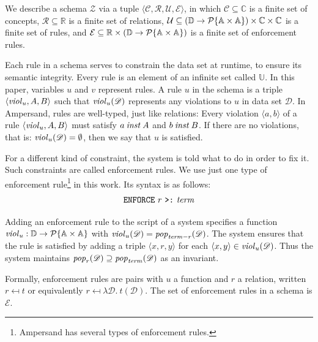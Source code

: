 \documentclass[runningheads]{llncs}
\newcommand{\id}[1]{\text{\it #1\/}}
\newcommand{\popF}[1]{\id{pop}_{#1}}
\newcommand{\pop}[2]{\popF{#1}(#2)}
\newcommand{\instance}{\mathbin{\id{inst}}}
\newcommand{\viol}[2]{\violC{#1}(#2)}
\newcommand{\violC}[1]{\id{viol}_{#1}}
\newcommand{\powerset}[1]{\cal{P}\{#1\}}
\newcommand{\pair}[2]{\langle{#1},{#2}\rangle}
\newcommand{\Pair}[2]{#1\times#2}
\newcommand{\triple}[3]{\langle{#1},{#2},{#3}\rangle}
\newcommand{\quadruple}[4]{\langle{#1},{#2},{#3},{#4}\rangle}
\newcommand{\Atoms}{\mathbb{A}}
\newcommand{\concepts}{\mathcal{C}}
\newcommand{\Concepts}{\mathbb{C}}
\newcommand{\rels}{\mathcal{R}}   %
\newcommand{\Rels}{\mathbb{R}}   %
\newcommand{\Triple}[3]{#1\times#2\times#3}
\newcommand{\enforces}{\mathcal{E}}
\newcommand{\rules}{\mathcal{U}}
\newcommand{\Rules}{\mathbb{U}}
\newcommand{\dataset}{\mathscr{D}}
\newcommand{\Dataset}{\mathbb{D}}
\newcommand{\schema}{\mathscr{Z}}
\begin{document}
   We describe a schema $\schema$ via a tuple $\quadruple{\concepts}{\rels}{\rules}{\enforces}$,
   in which $\concepts\subseteq \Concepts$ is a finite set of concepts,
   $\rels\subseteq \Rels$ is a finite set of relations,
   $\rules\subseteq \Triple{(\Dataset \to \powerset{\Pair{\Atoms}{\Atoms}})}{\Concepts}{\Concepts}$ is a finite set of rules,
   and $\enforces\subseteq \Pair{\Rels}{\left(\Dataset \to \powerset{\Pair{\Atoms}{\Atoms}}\right)}$ is a finite set of enforcement rules.
   
   Each rule in a schema serves to constrain the data set at runtime, to ensure its semantic integrity.
   Every rule is an element of an infinite set called $\Rules$.
   In this paper, variables $u$ and $v$ represent rules.
   A rule $u$ in the schema is a triple $\triple{\violC{u}}{A}{B}$ such that $\viol{u}{\dataset}$ represents any violations to $u$ in data set $\dataset$.
   In Ampersand, rules are well-typed, just like relations:
   Every violation $\pair{a}{b}$ of a rule $\triple{\violC{u}}{A}{B}$ must satisfy $a\instance A$ and $b\instance B$.
   If there are no violations, that is: $\viol{u}{\dataset} = \emptyset{}$, then we say that $u$ is satisfied.
   
   For a different kind of constraint, the system is told what to do in order to fix it.
   Such constraints are called enforcement rules.
   We use just one type of enforcement rule\footnote{Ampersand has several types of enforcement rules.} in this work.
   Its syntax is as follows:
\begin{align}
      \text{\tt ENFORCE}\ r\ \text{\tt >:}\ \id{term}\label{enforce ins}
\end{align}

   Adding an enforcement rule to the script of a system specifies a function $\violC{u} : \Dataset \to \powerset{\Pair{\Atoms}{\Atoms}}$
   with $\viol{u}{\dataset} = \pop{\id{term} - r}{\dataset}$.
   The system ensures that the rule is satisfied by adding a triple $\triple{x}{r}{y}$ for each $\pair{x}{y} \in \viol{u}{\dataset}$.
   Thus the system maintains $\pop{r}{\dataset} \supseteq \pop{\id{term}}{\dataset}$ as an invariant.
   
   Formally, enforcement rules are pairs with $u$ a function and $r$ a relation, written $r \mapsfrom t$ or equivalently $r \mapsfrom \lambda \dataset.~ t(\dataset)$.
   The set of enforcement rules in a schema is $\enforces$.
   
\end{document}
